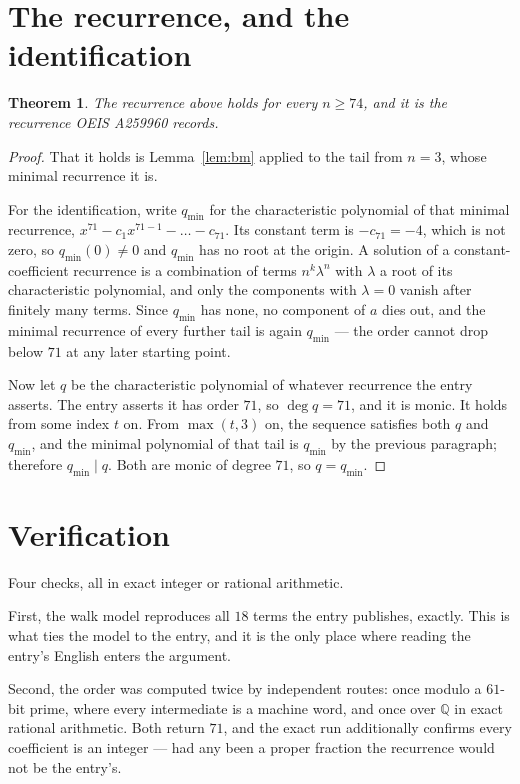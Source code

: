\documentclass[11pt,a4paper]{article}
\theoremstyle{plain}
\newtheorem{theorem}{Theorem}
\theoremstyle{definition}
\begin{document}
\section{The recurrence, and the identification}

\begin{theorem}
The recurrence above holds for every $n\ge74$, and it is the recurrence OEIS A259960 records.
\end{theorem}

\begin{proof}
That it holds is Lemma~\ref{lem:bm} applied to the tail from $n=3$, whose minimal
recurrence it is.

For the identification, write $q_{\min}$ for the characteristic polynomial of that minimal
recurrence, $x^{71}-c_1x^{71-1}-\dots-c_{71}$. Its constant term is
$-c_{71}=-4$, which is not zero, so $q_{\min}(0)\neq0$ and $q_{\min}$ has no
root at the origin. A solution of a constant-coefficient recurrence is a combination of terms
$n^{k}\lambda^{n}$ with $\lambda$ a root of its characteristic polynomial, and only the
components with $\lambda=0$ vanish after finitely many terms. Since $q_{\min}$ has none, no
component of $a$ dies out, and the minimal recurrence of every further tail is again
$q_{\min}$ --- the order cannot drop below $71$ at any later starting point.

Now let $q$ be the characteristic polynomial of whatever recurrence the entry asserts. The
entry asserts it has order $71$, so $\deg q=71$, and it is monic. It holds from some
index $t$ on. From $\max(t,3)$ on, the sequence satisfies both $q$ and $q_{\min}$, and
the minimal polynomial of that tail is $q_{\min}$ by the previous paragraph; therefore
$q_{\min}\mid q$. Both are monic of degree $71$, so $q=q_{\min}$.
\end{proof}

\section{Verification}

Four checks, all in exact integer or rational arithmetic.

First, the walk model reproduces all $18$ terms the entry publishes, exactly. This is
what ties the model to the entry, and it is the only place where reading the entry's English
enters the argument.

Second, the order was computed twice by independent routes: once modulo a $61$-bit prime, where
every intermediate is a machine word, and once over $\mathbb{Q}$ in exact rational arithmetic.
Both return $71$, and the exact run additionally confirms every coefficient is an integer
--- had any been a proper fraction the recurrence would not be the entry's.
\end{document}
